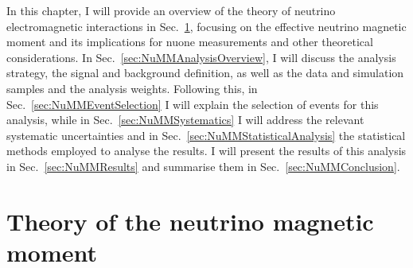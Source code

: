 



In this chapter, I will provide an overview of the theory of neutrino electromagnetic interactions in Sec.~\ref{sec:NuMMTheory}, focusing on the effective neutrino magnetic moment and its implications for \gls{nuone} measurements and other theoretical considerations. In Sec.~\ref{sec:NuMMAnalysisOverview}, I will discuss the analysis strategy, the signal and background definition, as well as the data and simulation samples and the analysis weights. Following this, in Sec.~\ref{sec:NuMMEventSelection} I will explain the selection of events for this analysis, while in Sec.~\ref{sec:NuMMSystematics} I will address the relevant systematic uncertainties and in Sec.~\ref{sec:NuMMStatisticalAnalysis} the statistical methods employed to analyse the results. I will present the results of this analysis in Sec.~\ref{sec:NuMMResults} and summarise them in Sec.~\ref{sec:NuMMConclusion}.

\section{Theory of the neutrino magnetic moment}\label{sec:NuMMTheory}

